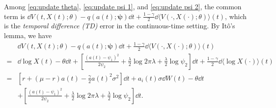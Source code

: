 Among \eqref{eq:update theta}, \eqref{eq:update psi 1}, and \eqref{eq:update psi 2}, the common term is $\dd V\left(t , X(t);\theta  \right) - q\left(a(t) ;\bm\psi\right)\dd t + \frac{1-\gamma}{2}\dd \langle V\left( \cdot,X(\cdot);\theta \right)\rangle(t)$, which is the \textit{temporal difference (TD)} error in the continuous-time setting. By It\^o's lemma, we have
\begin{equation}
\label{eq:td}
\begin{aligned}
& \dd V\left(t , X(t);\theta  \right) - q\left( a(t) ;\bm\psi\right)\dd t + \frac{1-\gamma}{2}\dd \langle V\left( \cdot,X(\cdot);\theta \right)\rangle(t) \\
=&  \dd \log X(t) - \theta\dd t + \left[ \frac{\left( a(t) - \psi_{1} \right)^2}{2\psi_{2}} + \frac{\lambda}{2}\log2\pi\lambda + \frac{\lambda}{2}\log\psi_{2} \right] \dd t + \frac{1-\gamma}{2} \dd \langle \log X(\cdot) \rangle(t) \\
= & \left[ r + (\mu - r)a(t) - \frac{\gamma}{2}a(t)^2\sigma^2 \right]\dd t + a_i(t)\sigma \dd W(t) - \theta\dd t \\
& + \left[ \frac{\left( a(t) - \psi_{1} \right)^2}{2\psi_{2}} + \frac{\lambda}{2}\log2\pi\lambda + \frac{\lambda}{2}\log\psi_{2} \right] \dd t . 
\end{aligned}
\end{equation}

